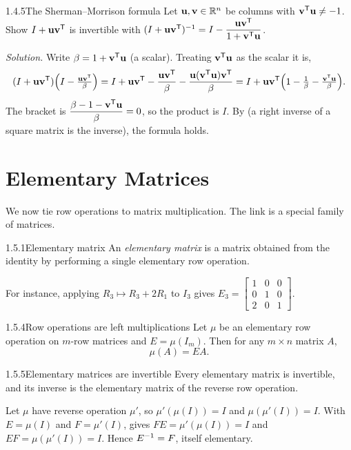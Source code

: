 \begin{exmp}{1.4.5}{The Sherman--Morrison formula}
Let $\mathbf{u},\mathbf{v}\in\mathbb{R}^n$ be columns with $\mathbf{v}^{\mathsf{T}}\mathbf{u}\neq-1$. Show $I+\mathbf{u}\mathbf{v}^{\mathsf{T}}$ is invertible with
$(I+\mathbf{u}\mathbf{v}^{\mathsf{T}})^{-1} = I-\dfrac{\mathbf{u}\mathbf{v}^{\mathsf{T}}}{1+\mathbf{v}^{\mathsf{T}}\mathbf{u}}$.

\smallskip
\noindent\textit{Solution.} Write $\beta=1+\mathbf{v}^{\mathsf{T}}\mathbf{u}$ (a scalar). Treating $\mathbf{v}^{\mathsf{T}}\mathbf{u}$ as the scalar it is,
\[
(I+\mathbf{u}\mathbf{v}^{\mathsf{T}})\Bigl(I-\tfrac{\mathbf{u}\mathbf{v}^{\mathsf{T}}}{\beta}\Bigr)
= I+\mathbf{u}\mathbf{v}^{\mathsf{T}}-\frac{\mathbf{u}\mathbf{v}^{\mathsf{T}}}{\beta}-\frac{\mathbf{u}(\mathbf{v}^{\mathsf{T}}\mathbf{u})\mathbf{v}^{\mathsf{T}}}{\beta}
= I+\mathbf{u}\mathbf{v}^{\mathsf{T}}\Bigl(1-\tfrac1\beta-\tfrac{\mathbf{v}^{\mathsf{T}}\mathbf{u}}{\beta}\Bigr).
\]
The bracket is $\dfrac{\beta-1-\mathbf{v}^{\mathsf{T}}\mathbf{u}}{\beta}=0$, so the product is $I$. By  (a right inverse of a square matrix is the inverse), the formula holds.
\end{exmp}

\section{Elementary Matrices}
\label{sec:1.5}

We now tie row operations to matrix multiplication. The link is a special family of matrices.

\begin{defns}{1.5.1}{Elementary matrix}
An \emph{elementary matrix} is a matrix obtained from the identity by performing a single elementary row operation.
\end{defns}

For instance, applying $R_3\mapsto R_3+2R_1$ to $I_3$ gives $E_3=\left[\begin{smallmatrix}1&0&0\\0&1&0\\2&0&1\end{smallmatrix}\right]$.

\begin{thms}{1.5.4}{Row operations are left multiplications}
Let $\mu$ be an elementary row operation on $m$-row matrices and $E=\mu(I_m)$. Then for any $m\times n$ matrix $A$,
\[
\mu(A)=EA.
\]
\end{thms}

\begin{thms}{1.5.5}{Elementary matrices are invertible}
Every elementary matrix is invertible, and its inverse is the elementary matrix of the reverse row operation.
\end{thms}

\begin{prf}
Let $\mu$ have reverse operation $\mu'$, so $\mu'(\mu(I))=I$ and $\mu(\mu'(I))=I$. With $E=\mu(I)$ and $F=\mu'(I)$,  gives $FE=\mu'(\mu(I))=I$ and $EF=\mu(\mu'(I))=I$. Hence $E^{-1}=F$, itself elementary.
\end{prf}

